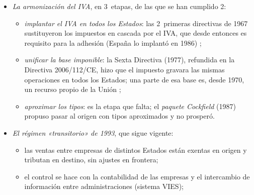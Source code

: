 \documentclass[11pt]{article}
\begin{document}
\begin{itemize}
{\begin{itemize}
\item con \emph{origen}, cada bien soporta el impuesto del país donde se produce, y la recaudación es de ese país; para que 2~bienes de 2~países compitan en igualdad dentro de un mismo mercado, hay que armonizar bases y tipos;
\item con \emph{destino}, el bien soporta el impuesto del país donde se consume, y la recaudación es del importador; cada Estado conserva su tipo, pero hay que controlar las operaciones.
\end{itemize}
Los Estados se han resistido al origen porque les quita autonomía y porque los importadores netos perderían recaudación.}
  \begin{itemize}
  \item \emph{origen}: no exige controles, pero sí armonizar los tipos;
  \item \emph{destino}: deja a cada Estado su tipo, pero exige controlar las operaciones entre Estados.
  \end{itemize}
\item \emph{La armonización del IVA}, en 3~etapas, de las que se han cumplido 2\nocite{UE2006IVA,UE2022Tipos}:
  \begin{itemize}
  \item \emph{implantar el IVA en todos los Estados}: las 2~primeras directivas de 1967 sustituyeron los impuestos en cascada por el IVA, que desde entonces es requisito para la adhesión (España lo implantó en 1986) ;
  \item \emph{unificar la base imponible}: la Sexta Directiva (1977), refundida en la Directiva 2006/112/CE, hizo que el impuesto gravara las mismas operaciones en todos los Estados; una parte de esa base es, desde 1970, un recurso propio de la Unión ;
  \item \emph{aproximar los tipos}: es la etapa que falta; el \emph{paquete Cockfield} (1987) propuso pasar al origen con tipos aproximados y no prosperó.
  \end{itemize}
\item \emph{El régimen «transitorio» de 1993}, que sigue vigente:
  \begin{itemize}
  \item las ventas entre empresas de distintos Estados están exentas en origen y tributan en destino, sin ajustes en frontera;
  \item el control se hace con la contabilidad de las empresas y el intercambio de información entre administraciones (sistema VIES);

\end{itemize}
\end{itemize}
\end{document}
